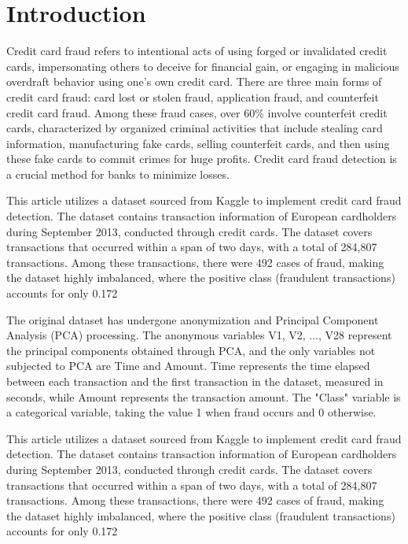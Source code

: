 \section{Introduction}\label{sec-intro}




Credit card fraud refers to intentional acts of using forged or invalidated credit cards, impersonating others to deceive for financial gain, or engaging in malicious overdraft behavior using one's own credit card. There are three main forms of credit card fraud: card lost or stolen fraud, application fraud, and counterfeit credit card fraud. Among these fraud cases, over 60\% involve counterfeit credit cards, characterized by organized criminal activities that include stealing card information, manufacturing fake cards, selling counterfeit cards, and then using these fake cards to commit crimes for huge profits. Credit card fraud detection is a crucial method for banks to minimize losses.



This article utilizes a dataset sourced from Kaggle to implement credit card fraud detection. The dataset contains transaction information of European cardholders during September 2013, conducted through credit cards. The dataset covers transactions that occurred within a span of two days, with a total of 284,807 transactions. Among these transactions, there were 492 cases of fraud, making the dataset highly imbalanced, where the positive class (fraudulent transactions) accounts for only 0.172%

The original dataset has undergone anonymization and Principal Component Analysis (PCA) processing. The anonymous variables V1, V2, ..., V28 represent the principal components obtained through PCA, and the only variables not subjected to PCA are Time and Amount. Time represents the time elapsed between each transaction and the first transaction in the dataset, measured in seconds, while Amount represents the transaction amount. The "Class" variable is a categorical variable, taking the value 1 when fraud occurs and 0 otherwise.


This article utilizes a dataset sourced from Kaggle to implement credit card fraud detection. The dataset contains transaction information of European cardholders during September 2013, conducted through credit cards. The dataset covers transactions that occurred within a span of two days, with a total of 284,807 transactions. Among these transactions, there were 492 cases of fraud, making the dataset highly imbalanced, where the positive class (fraudulent transactions) accounts for only 0.172%



